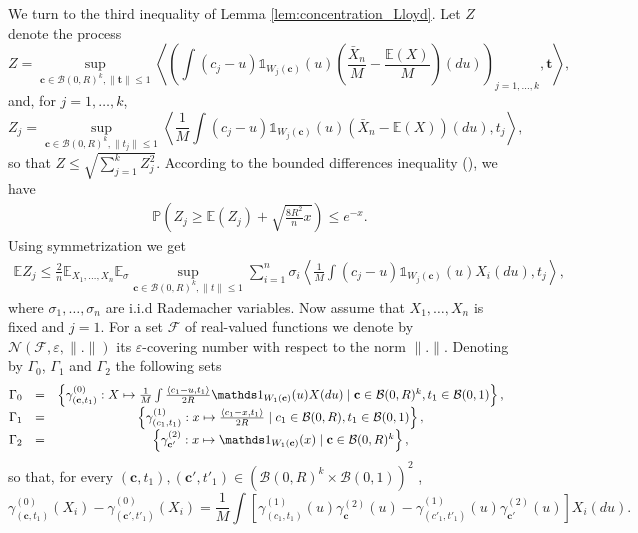 \documentclass[noinfoline,preprint]{article}
\newcommand{\cb}{\mathbf{c}}
\renewcommand{\1}{\mathds 1}
\newcommand{\B}{\mathcal{B}}
\begin{document}
We turn to the third inequality of Lemma \ref{lem:concentration_Lloyd}. Let $Z$ denote the process
\[
Z = \sup_{\cb \in \B(0,R)^k, \|\mathbf{t}\| \leq 1} \left\langle \left ( \int   (c_j-u)\1_{W_j(\cb)}(u) \left (\frac{\bar{X}_n}{M} - \frac{\mathbb{E}(X)}{M} \right )(du) \right )_{j=1, \hdots, k},\mathbf{t} \right\rangle, 
\]
and, for $j=1, \hdots, k$, 
\[
Z_j = \sup_{\cb \in \B(0,R)^k, \|t_j\| \leq 1} \left\langle \frac{1}{M} \int (c_j-u)\1_{W_j(\cb)}(u)(\bar{X}_n - \mathbb{E}(X))(du) ,t_j \right\rangle,
\]
so that 
$Z \leq \sqrt{\sum_{j=1}^{k} Z_j^2}$. 
According to the bounded differences inequality (\cite[Theorem 6.2]{Massart13}), we have
\begin{align*}
\mathbb{P} \left ( Z_j \geq \mathbb{E}(Z_j) + \sqrt{\frac{8 R^2}{n}x} \right ) \leq e^{-x}.
\end{align*}
Using symmetrization we get 
\begin{align*}
\mathbb{E}Z_j \leq \frac{2}{n} \mathbb{E}_{X_1, \hdots, X_n} \mathbb{E}_\sigma \sup_{\cb \in \B(0,R)^k, \|t\| \leq 1} \sum_{i=1}^n { \sigma_i \left\langle \frac{1}{M} \int (c_j-u)\1_{W_j(\cb)}(u)X_i(du) ,t_j \right\rangle}, 
\end{align*}
where $\sigma_1, \hdots, \sigma_n$ are i.i.d Rademacher variables. Now assume that $X_1, \hdots, X_n$ is fixed and $j=1$. For a set $\mathcal{F}$ of real-valued functions we denote by $\mathcal{N}(\mathcal{F}, \varepsilon, \|.\|)$ its $\varepsilon$-covering number with respect to the norm $\|.\|$. Denoting by $\Gamma_0$, $\Gamma_1$ and $\Gamma_2$ the following sets
\begin{align*}
\begin{array}{@{}ccc}
\Gamma_0 &=&  \left \{ \gamma^{(0)}_{(\cb,t_1)}:X \mapsto \frac{1}{M} \int \frac{\left\langle  c_1-u,t_1  \right\rangle}{2R} \1_{W_1(\cb)}(u) X(du)  \mid \cb \in \B(0,R)^k, t_1 \in \B(0,1) \right \}, \\
\Gamma_1 & =& \left \{ \gamma^{(1)}_{(c_1,t_1)}: x \mapsto \frac{\left\langle c_1-x,t_1 \right\rangle}{2R} \mid c_1 \in \B(0,R), t_1 \in \B(0,1) \right \}, \\
\Gamma_2 & =& \left \{ \gamma^{(2)}_{\cb'}:x \mapsto \1_{W_1(\cb)}(x) \mid \cb \in \B(0,R)^k \right \},
\end{array}
\end{align*}
so that, for every $(\cb,t_1), (\cb',t'_1) \in (\mathcal{B}(0,R)^k \times \mathcal{B}(0,1))^2$ , 
\[
\gamma^{(0)}_{(\cb,t_1)}(X_i) - \gamma^{(0)}_{(\cb',t'_1)}(X_i) = \frac{1}{M} \int \left [ \gamma^{(1)}_{(c_1,t_1)}(u)\gamma^{(2)}_{\cb}(u) - \gamma^{(1)}_{(c'_1,t'_1)}(u)\gamma^{(2)}_{\cb'}(u) \right ]X_i(du).
\]
\end{document}
